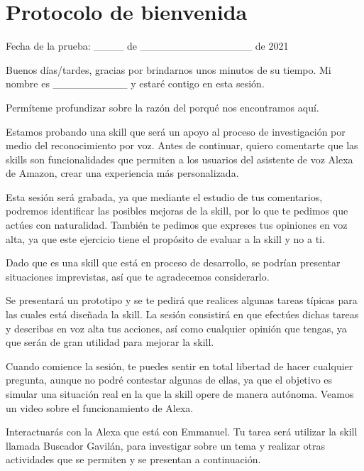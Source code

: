 
\section{Protocolo de bienvenida}
\label{B2Anexo}

\begin{tcolorbox}[colback=white!25!white,colframe=blue]
  Fecha de la prueba: \_\_\_\_ de \_\_\_\_\_\_\_\_\_\_\_\_\_\_\_ de 2021

  Buenos días/tardes, gracias por brindarnos unos minutos de su tiempo. Mi nombre es \_\_\_\_\_\_\_\_\_\_ y estaré contigo en esta sesión.

  Permíteme profundizar sobre la razón del porqué nos encontramos aquí.

  Estamos probando una skill que será un apoyo al proceso de investigación por medio del reconocimiento por voz. Antes de continuar, quiero comentarte que las skills son funcionalidades que permiten a los usuarios del asistente de voz Alexa de Amazon, crear una experiencia más personalizada.

  Esta sesión será grabada, ya que mediante el estudio de tus comentarios, podremos identificar las posibles mejoras de la skill, por lo que te pedimos que actúes con naturalidad. También te pedimos que expreses tus opiniones en voz alta, ya que este ejercicio tiene el propósito de evaluar a la skill y no a ti.

  Dado que es una skill que está en proceso de desarrollo, se podrían presentar situaciones imprevistas, así que te agradecemos considerarlo.

  Se presentará un prototipo y se te pedirá que realices algunas tareas típicas para las cuales está diseñada la skill. La sesión consistirá en que efectúes dichas tareas y describas en voz alta tus acciones, así como cualquier opinión que tengas, ya que serán de gran utilidad para mejorar la skill.

  Cuando comience la sesión, te puedes sentir en total libertad de hacer cualquier pregunta, aunque no podré contestar algunas de ellas, ya que el objetivo es simular una situación real en la que la skill opere de manera autónoma.
  Veamos un video sobre el funcionamiento de Alexa.

  Interactuarás con la Alexa que está con Emmanuel. Tu tarea será utilizar la skill llamada Buscador Gavilán, para investigar sobre un tema y realizar otras actividades que se permiten y se presentan a continuación.


\end{tcolorbox}
